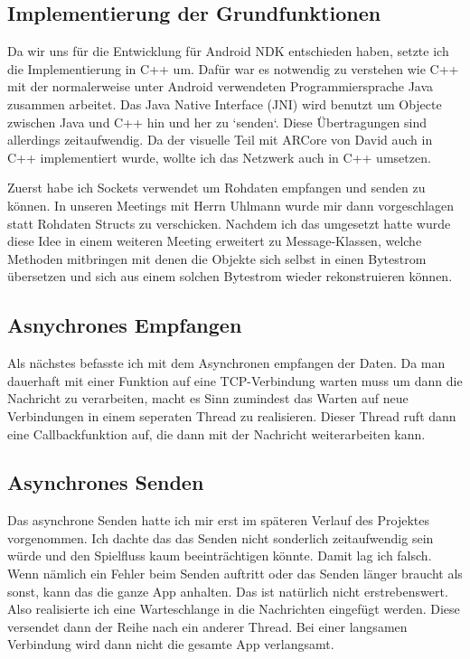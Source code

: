 \subsection{Implementierung der Grundfunktionen}
Da wir uns für die Entwicklung für Android NDK entschieden haben, setzte ich die Implementierung in C++ um.
Dafür war es notwendig zu verstehen wie C++ mit der normalerweise unter Android verwendeten Programmiersprache Java
zusammen arbeitet.
Das Java Native Interface (JNI) wird benutzt um Objecte zwischen Java und C++ hin und her zu `senden`. Diese Übertragungen sind allerdings
zeitaufwendig. Da der visuelle Teil mit ARCore von David auch in C++ implementiert wurde, wollte ich das Netzwerk auch in C++ umsetzen.
\par
Zuerst habe ich Sockets verwendet um Rohdaten empfangen und senden zu können.
In unseren Meetings mit Herrn Uhlmann wurde mir dann vorgeschlagen statt Rohdaten Structs zu verschicken.
Nachdem ich das umgesetzt hatte wurde diese Idee in einem weiteren Meeting erweitert zu Message-Klassen, welche Methoden mitbringen
mit denen die Objekte sich selbst in einen Bytestrom übersetzen und sich aus einem solchen Bytestrom wieder rekonstruieren können.
\subsection{Asnychrones Empfangen}
Als nächstes befasste ich mit dem Asynchronen empfangen der Daten. Da man dauerhaft mit einer Funktion auf eine TCP-Verbindung warten muss
um dann die Nachricht zu verarbeiten, macht es Sinn zumindest das Warten auf neue Verbindungen in einem seperaten Thread zu realisieren.
Dieser Thread ruft dann eine Callbackfunktion auf, die dann mit der Nachricht weiterarbeiten kann.
\subsection{Asynchrones Senden}
Das asynchrone Senden hatte ich mir erst im späteren Verlauf des Projektes vorgenommen. Ich dachte das das Senden nicht sonderlich
zeitaufwendig sein würde und den Spielfluss kaum beeinträchtigen könnte. Damit lag ich falsch. Wenn nämlich ein Fehler beim Senden
auftritt oder das Senden länger braucht als sonst, kann das die ganze App anhalten. Das ist natürlich nicht erstrebenswert.
Also realisierte ich eine Warteschlange in die Nachrichten eingefügt werden. Diese versendet dann der Reihe nach ein anderer Thread.
Bei einer langsamen Verbindung wird dann nicht die gesamte App verlangsamt.

